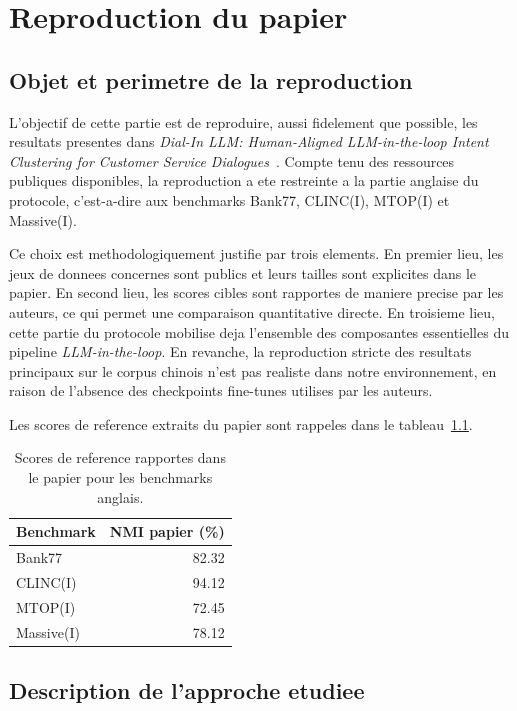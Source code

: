 \chapter{Reproduction du papier}

\section{Objet et perimetre de la reproduction}

L'objectif de cette partie est de reproduire, aussi fidelement que possible,
les resultats presentes dans \emph{Dial-In LLM: Human-Aligned LLM-in-the-loop
Intent Clustering for Customer Service Dialogues}~\cite{hong2025dialinllm}.
Compte tenu des ressources publiques disponibles, la reproduction a ete
restreinte a la partie anglaise du protocole, c'est-a-dire aux benchmarks
Bank77, CLINC(I), MTOP(I) et Massive(I).

Ce choix est methodologiquement justifie par trois elements. En premier lieu,
les jeux de donnees concernes sont publics et leurs tailles sont explicites
dans le papier. En second lieu, les scores cibles sont rapportes de maniere
precise par les auteurs, ce qui permet une comparaison quantitative directe.
En troisieme lieu, cette partie du protocole mobilise deja l'ensemble des
composantes essentielles du pipeline \emph{LLM-in-the-loop}. En revanche, la
reproduction stricte des resultats principaux sur le corpus chinois n'est pas
realiste dans notre environnement, en raison de l'absence des checkpoints
fine-tunes utilises par les auteurs.

Les scores de reference extraits du papier sont rappeles dans le
tableau~\ref{tab:paper-targets}.

\begin{table}[h]
  \centering
  \begin{tabular}{lr}
    \toprule
    Benchmark & NMI papier (\%) \\
    \midrule
    Bank77 & 82.32 \\
    CLINC(I) & 94.12 \\
    MTOP(I) & 72.45 \\
    Massive(I) & 78.12 \\
    \bottomrule
  \end{tabular}
  \caption{Scores de reference rapportes dans le papier pour les benchmarks anglais.}
  \label{tab:paper-targets}
\end{table}

\section{Description de l'approche etudiee}

